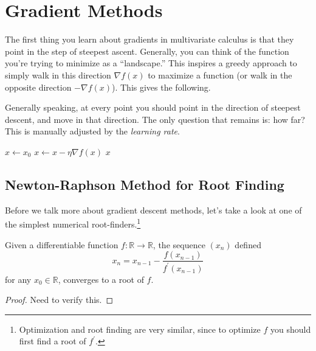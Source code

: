\section{Gradient Methods} 

  The first thing you learn about gradients in multivariate calculus is that they point in the step of steepest ascent. Generally, you can think of the function you're trying to minimize as a ``landscape.'' This inspires a greedy approach to simply walk in this direction $\nabla f(x)$ to maximize a function (or walk in the opposite direction $-\nabla f(x)$). This gives the following. 

  \begin{algo}
    Generally speaking, at every point you should point in the direction of steepest descent, and move in that direction. The only question that remains is: how far? This is manually adjusted by the \textit{learning rate}. 

    \begin{algorithm}[H]
    \label{alg:gradient-descent}
    \begin{algorithmic}[1]  %
        \State $x \gets x_0$ 
          \State $x \gets x - \eta \nabla f(x)$
        \EndWhile
        \State \Return $x$ 
      \EndProcedure
    \end{algorithmic}
    \end{algorithm} 
  \end{algo}

\subsection{Newton-Raphson Method for Root Finding} 

  Before we talk more about gradient descent methods, let's take a look at one of the simplest numerical root-finders.\footnote{Optimization and root finding are very similar, since to optimize $f$ you should first find a root of $f^\prime$.}

  \begin{theorem}[Convergence]
    Given a differentiable function $f: \mathbb{R} \to \mathbb{R}$, the sequence $(x_n)$ defined 
    \begin{equation}
      x_n = x_{n-1} - \frac{f(x_{n-1})}{f^\prime (x_{n-1})}
    \end{equation}
    for any $x_0 \in \mathbb{R}$, converges to a root of $f$. 
  \end{theorem}
  \begin{proof}
    Need to verify this. 
  \end{proof}

